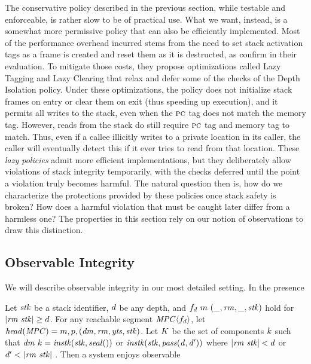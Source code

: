 \documentclass[acmsmall,review,anonymous]{acmart}\settopmatter{printfolios=true,printccs=false,printacmref=false}
\begin{document}
The conservative policy described in the previous section, while
testable and enforceable, is rather slow to be of practical use. What
we want, instead, is a somewhat more permissive policy that can also
be efficiently implemented. Most of the performance overhead incurred
stems from the need to set stack activation tags as a frame is created
and reset them as it is destructed, as
\citet{DBLP:conf/sp/RoesslerD18} confirm in their evaluation. To
mitigate those costs, they propose optimizations called Lazy Tagging and
Lazy Clearing that relax and defer some of the checks of the Depth Isolation
policy. Under these optimizations, the policy does not initialize stack
frames on entry or clear them on exit (thus speeding up execution),
and it permits all writes to the stack, even when the $\textsc{pc}$ tag
does not match the memory tag.
However, reads from the stack do still require $\textsc{pc}$ tag and memory tag
to match. Thus, even if a callee illicitly writes to a private location
in its caller, the caller will eventually detect this if it ever tries to read from
that location.
%
These \emph{lazy policies} admit more efficient implementations, but
they deliberately allow violations of stack integrity temporarily,
with the checks deferred until the point a violation truly becomes
harmful. The natural question then is, how do we characterize the
protections provided by these policies once stack safety is broken?
How does a harmful violation that must be caught later differ from a
harmless one? The properties in this section rely on our notion of
observations to draw this distinction.

\subsection{Observable Integrity}

We will describe observable integrity in our most detailed setting. In the
presence

 Let \(\mathit{stk}\) be a stack identifier, \(d\) be any depth, and
\(f_d ~ m ~ (\_, \mathit{rm}, \_, \mathit{stk})\) hold for \(|\mathit{rm} ~ \mathit{stk}| \geq d\).
For any reachable segment \(\mathit{MPC} \langle f_d \rangle\),
let \(\mathit{head}(\mathit{MPC}) = m,p,(\mathit{dm},\mathit{rm},\mathit{yts},\mathit{stk})\). Let
\(K\) be the set of components \(k\) such that
\(\mathit{dm} ~ k = \mathit{instk}(\mathit{stk},\mathit{seal())}\) or \(\mathit{instk}(\mathit{stk},\mathit{pass(d,d')})\)
where \(|\mathit{rm} ~ \mathit{stk}| < d\) or \(d' < |\mathit{rm} ~ \mathit{stk}|\) .
Then a system enjoys observable
\end{document}
